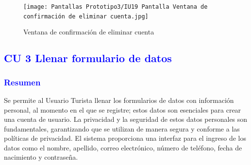 \begin{figure}[htbp]
        \centering
        \texttt{[image: Pantallas Prototipo3/IU19 Pantalla Ventana de confirmación de eliminar cuenta.jpg]}
        \caption{Ventana de confirmación de eliminar cuenta}
        \label{fig:enter-label}
        \vspace{200pt}
\end{figure}
\newpage


\subsection{\textcolor{blue}{CU 3 Llenar formulario de datos}}
\subsubsection{\textcolor{blue}{Resumen}}
             Se permite al Usuario Turista llenar los formularios de datos con información personal, al momento en el que se registre; estos datos son esenciales para crear una cuenta de usuario. La privacidad y la seguridad de estos datos personales son fundamentales, garantizando que se utilizan de manera segura y conforme a las políticas de privacidad. El sistema proporciona una interfaz para el ingreso de los datos como el nombre, apellido, correo electrónico, número de teléfono, fecha de nacimiento y contraseña.
             
